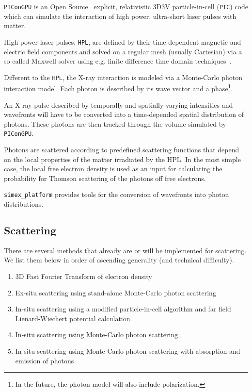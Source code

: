 \documentclass[a4paper]{article}
\begin{document}
\texttt{PIConGPU} is an Open Source~\cite{picongpu_github} explicit, relativistic 3D3V particle-in-cell (\texttt{PIC}) code which can simulate the interaction of high power, ultra-short laser pulses with matter.

High power laser pulses, \texttt{HPL}, are defined by their time dependent magnetic and electric field components and solved on a regular mesh (usually Cartesian) via a so called Maxwell solver using e.g. finite difference time domain techniques~\cite{Yee1966}.

Different to the \texttt{HPL}, the X-ray interaction is modeled via a Monte-Carlo photon interaction model. Each photon is described by its wave vector and a phase\footnote{In the future, the photon model will also include polarization.}.

An X-ray pulse described by temporally and spatially varying intensities and wavefronts will have to be converted into a time-depended spatial distribution of photons. These photons are then tracked through the volume simulated by \texttt{PIConGPU}.

Photons are scattered according to predefined scattering functions that depend on the local properties of the matter irradiated by the HPL. In the most simple case, the local free electron density is used as an input for calculating the probability for Thomson scattering of the photons off free electrons.

\texttt{simex\_platform} provides tools for the conversion of wavefronts into photon distributions.
\subsection{Scattering}

There are several methods that already are or will be implemented for scattering. We list them below in order of ascending generality (and technical difficulty).

\begin{enumerate}
\item 3D Fast Fourier Transform of electron density \label{pmi:methods:fft}
\item Ex-situ scattering using stand-alone Monte-Carlo photon scattering \label{pmi:methods:exsituphoton}
\item In-situ scattering using a modified particle-in-cell algorithm and far field Lienard-Wiechert potential calculation.\label{pmi:methods:insitulienardwiechert}
\item In-situ scattering using Monte-Carlo photon scattering\label{pmi:methods:insituphoton}
\item In-situ scattering using Monte-Carlo photon scattering with absorption and emission of photons\label{pmi:methods:insituphotoninteract}
\end{enumerate}
\end{document}
